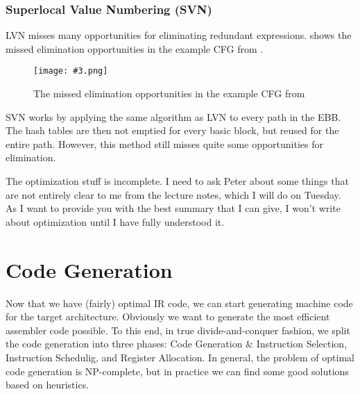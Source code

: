 \documentclass{article}
\newcommand{\fig}[4]{
	\begin{figure}[#1]
		\center
		\texttt{[image: \#3.png]}
		\caption{#4}
		\label{fig:#3}
	\end{figure}
	}
\begin{document}
\subsubsection{Superlocal Value Numbering (SVN)}
LVN misses many opportunities for eliminating redundant expressions.
 shows the missed elimination opportunities in the example CFG from .

\fig{h}{0.7}{missedops}{The missed elimination opportunities in the example CFG from \Cref{cfg}}

SVN works by applying the same algorithm as LVN to every path in the EBB.
The hash tables are then not emptied for every basic block, but reused for the entire path.
However, this method still misses quite some opportunities for elimination.




\begin{keypointbox}
	The optimization stuff is incomplete.
	I need to ask Peter about some things that are not entirely clear to me from the lecture notes, which I will do on Tuesday.
	As I want to provide you with the best summary that I can give, I won't write about optimization until I have fully understood it.
\end{keypointbox}

\section{Code Generation}
Now that we have (fairly) optimal IR code, we can start generating machine code for the target architecture.
Obviously we want to generate the most efficient assembler code possible.
To this end, in true divide-and-conquer fashion, we split the code generation into three phases: Code Generation \& Instruction Selection, Instruction Schedulig, and Register Allocation.
In general, the problem of optimal code generation is NP-complete, but in practice we can find some good solutions based on heuristics.
\end{document}
